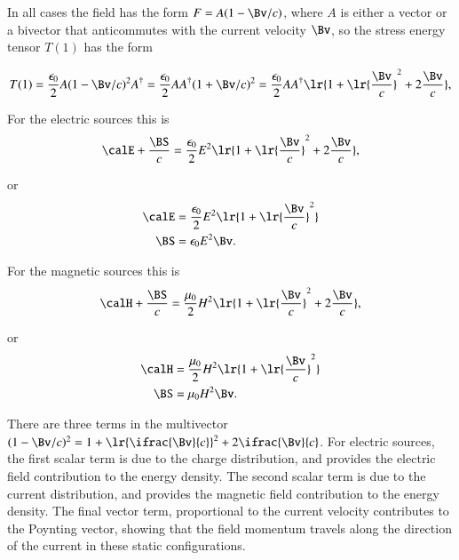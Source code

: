 In all cases the field has the form \( F = A ( 1 - \Bv/c ) \), where \( A \) is either a vector or a bivector that anticommutes with the current velocity \( \Bv \), so the stress energy tensor \( T(1) \) has the form

\begin{dmath}\label{eqn:poyntingF:860}
T(1)
= \frac{\epsilon_0}{2} A ( 1 - \Bv/c )^2 A^\dagger
= \frac{\epsilon_0}{2} A A^\dagger ( 1 + \Bv/c )^2
= \frac{\epsilon_0}{2} A A^\dagger \lr{ 1 + \lr{ \frac{\Bv}{c} }^2 + 2 \frac{\Bv}{c} },
\end{dmath}

For the electric sources this is
\begin{dmath}\label{eqn:poyntingF:880}
\calE + \frac{\BS}{c} = \frac{\epsilon_0}{2} E^2 \lr{ 1 + \lr{ \frac{\Bv}{c} }^2 + 2 \frac{\Bv}{c} },
\end{dmath}

or
\begin{dmath}\label{eqn:poyntingF:900}
\begin{aligned}
\calE &= \frac{\epsilon_0}{2} E^2 \lr{ 1 + \lr{ \frac{\Bv}{c} }^2 } \\
\BS &= \epsilon_0 E^2 \Bv.
\end{aligned}
\end{dmath}

For the magnetic sources this is
\begin{dmath}\label{eqn:poyntingF:920}
\calH + \frac{\BS}{c} = \frac{\mu_0}{2} H^2 \lr{ 1 + \lr{ \frac{\Bv}{c} }^2 + 2 \frac{\Bv}{c} },
\end{dmath}

or
\begin{dmath}\label{eqn:poyntingF:940}
\begin{aligned}
\calH &= \frac{\mu_0}{2} H^2 \lr{ 1 + \lr{ \frac{\Bv}{c} }^2 } \\
\BS &= \mu_0 H^2 \Bv.
\end{aligned}
\end{dmath}

There are three terms in the multivector \( (1 -\Bv/c)^2 = 1 + \lr{ \ifrac{\Bv}{c} }^2 + 2 \ifrac{\Bv}{c} \).  For electric sources,
the first scalar term is due to the charge distribution, and provides the electric field contribution to the energy density.
The second scalar term is due to the current distribution, and provides the magnetic field contribution to the energy density.
The final vector term, proportional to the current velocity contributes to the Poynting vector, showing that the field momentum travels along the direction of the current in these static configurations.
